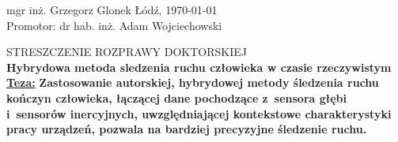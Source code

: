 \documentclass[10pt,a4paper]{article}
\author{Grzegorz Glonek}
\begin{document}
	

	\begin{FlushLeft}
mgr inż. Grzegorz Glonek \hfill 	Łódź, \today \\					
	Promotor: dr hab. inż. Adam Wojciechowski
\end{FlushLeft}

\vspace*{2cm}
\Centering
STRESZCZENIE ROZPRAWY DOKTORSKIEJ\\
\vspace*{0.5cm}
\textbf{Hybrydowa metoda sledzenia ruchu człowieka w czasie rzeczywistym}\\

\vspace*{1.5cm}
\justify
\textbf{\underline{Teza:}} \textbf{Zastosowanie autorskiej, hybrydowej metody śledzenia ruchu kończyn człowieka, łączącej dane pochodzące z~sensora głębi i~sensorów inercyjnych, uwzględniającej kontekstowe charakterystyki pracy urządzeń, pozwala na bardziej precyzyjne śledzenie ruchu.}
\end{document}
